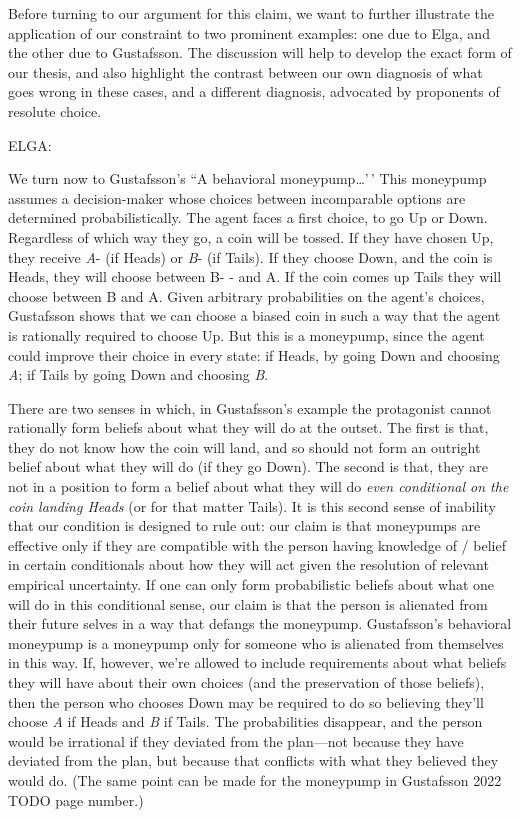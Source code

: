 \documentclass[
  11pt,
  letterpaper,
  DIV=11,
  numbers=noendperiod,
  twoside]{scrartcl}
\begin{document}
Before turning to our argument for this claim, we want to further
illustrate the application of our constraint to two prominent examples:
one due to Elga, and the other due to Gustafsson. The discussion will
help to develop the exact form of our thesis, and also highlight the
contrast between our own diagnosis of what goes wrong in these cases,
and a different diagnosis, advocated by proponents of resolute choice.

ELGA:

We turn now to Gustafsson's ``A behavioral moneypump\ldots'\,' This
moneypump assumes a decision-maker whose choices between incomparable
options are determined probabilistically. The agent faces a first
choice, to go Up or Down. Regardless of which way they go, a coin will
be tossed. If they have chosen Up, they receive \emph{A}- (if Heads) or
\emph{B}- (if Tails). If they choose Down, and the coin is Heads, they
will choose between B- - and A. If the coin comes up Tails they will
choose between B and A. Given arbitrary probabilities on the agent's
choices, Gustafsson shows that we can choose a biased coin in such a way
that the agent is rationally required to choose Up. But this is a
moneypump, since the agent could improve their choice in every state: if
Heads, by going Down and choosing \emph{A}; if Tails by going Down and
choosing \emph{B}.

There are two senses in which, in Gustafsson's example the protagonist
cannot rationally form beliefs about what they will do at the outset.
The first is that, they do not know how the coin will land, and so
should not form an outright belief about what they will do (if they go
Down). The second is that, they are not in a position to form a belief
about what they will do
\emph{even conditional on the coin landing Heads} (or for that matter
Tails). It is this second sense of inability that our condition is
designed to rule out: our claim is that moneypumps are effective only if
they are compatible with the person having knowledge of / belief in
certain conditionals about how they will act given the resolution of
relevant empirical uncertainty. If one can only form probabilistic
beliefs about what one will do in this conditional sense, our claim is
that the person is alienated from their future selves in a way that
defangs the moneypump. Gustafsson's behavioral moneypump is a moneypump
only for someone who is alienated from themselves in this way. If,
however, we're allowed to include requirements about what beliefs they
will have about their own choices (and the preservation of those
beliefs), then the person who chooses Down may be required to do so
believing they'll choose \emph{A} if Heads and \emph{B} if Tails. The
probabilities disappear, and the person would be irrational if they
deviated from the plan---not because they have deviated from the plan,
but because that conflicts with what they believed they would do. (The
same point can be made for the moneypump in Gustafsson 2022 TODO page
number.)
\end{document}
